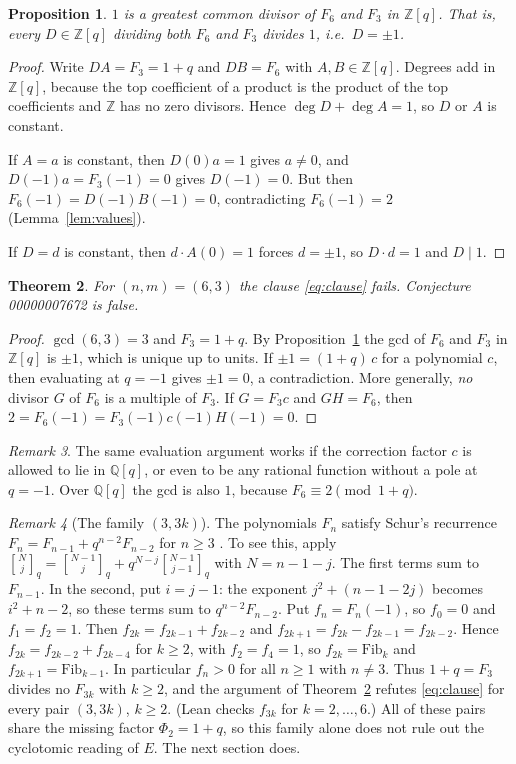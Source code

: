 \documentclass[11pt]{article}
\newtheorem{theorem}{Theorem}
\newtheorem{proposition}[theorem]{Proposition}
\theoremstyle{remark}
\newtheorem{remark}[theorem]{Remark}
\newcommand{\qbinom}[2]{\genfrac{[}{]}{0pt}{}{#1}{#2}_q}
\begin{document}
\begin{proposition}\label{prop:gcd}
$1$ is a greatest common divisor of $F_6$ and $F_3$ in $\mathbb Z[q]$. That is,
every $D\in\mathbb Z[q]$ dividing both $F_6$ and $F_3$ divides $1$, i.e.\
$D=\pm1$.
\end{proposition}
\begin{proof}
Write $DA=F_3=1+q$ and $DB=F_6$ with $A,B\in\mathbb Z[q]$. Degrees add in
$\mathbb Z[q]$, because the top coefficient of a product is the product of the
top coefficients and $\mathbb Z$ has no zero divisors. Hence
$\deg D+\deg A=1$, so $D$ or $A$ is constant.

If $A=a$ is constant, then $D(0)a=1$ gives $a\ne0$, and $D(-1)a=F_3(-1)=0$
gives $D(-1)=0$. But then $F_6(-1)=D(-1)B(-1)=0$, contradicting
$F_6(-1)=2$ (Lemma~\ref{lem:values}).

If $D=d$ is constant, then $d\cdot A(0)=1$ forces $d=\pm1$, so $D\cdot d=1$
and $D\mid 1$.
\end{proof}

\begin{theorem}\label{thm:main}
For $(n,m)=(6,3)$ the clause \eqref{eq:clause} fails. Conjecture 00000007672 is
false.
\end{theorem}
\begin{proof}
$\gcd(6,3)=3$ and $F_3=1+q$. By Proposition~\ref{prop:gcd} the gcd of $F_6$ and
$F_3$ in $\mathbb Z[q]$ is $\pm1$, which is unique up to units. If
$\pm1=(1+q)\,c$ for a polynomial $c$, then evaluating at $q=-1$ gives
$\pm1=0$, a contradiction. More generally, \emph{no} divisor $G$ of $F_6$ is a
multiple of $F_3$. If $G=F_3c$ and $GH=F_6$, then
$2=F_6(-1)=F_3(-1)c(-1)H(-1)=0$.
\end{proof}

\begin{remark}\label{rem:Q}
The same evaluation argument works if the correction factor $c$ is allowed to
lie in $\mathbb Q[q]$, or even to be any rational function without a pole at
$q=-1$. Over $\mathbb Q[q]$ the gcd is also $1$, because $F_6\equiv 2 \pmod{1+q}$.
\end{remark}

\begin{remark}[The family $(3,3k)$]
The polynomials $F_n$ satisfy Schur's recurrence
$F_n=F_{n-1}+q^{n-2}F_{n-2}$ for $n\ge3$ \cite{andrews}. To see this, apply
$\qbinom{N}{j}=\qbinom{N-1}{j}+q^{N-j}\qbinom{N-1}{j-1}$ with $N=n-1-j$. The
first terms sum to $F_{n-1}$. In the second, put $i=j-1$: the exponent
$j^2+(n-1-2j)$ becomes $i^2+n-2$, so these terms sum to $q^{n-2}F_{n-2}$.
Put $f_n=F_n(-1)$, so $f_0=0$ and $f_1=f_2=1$. Then
$f_{2k}=f_{2k-1}+f_{2k-2}$ and $f_{2k+1}=f_{2k}-f_{2k-1}=f_{2k-2}$. Hence
$f_{2k}=f_{2k-2}+f_{2k-4}$ for $k\ge2$, with $f_2=f_4=1$, so
$f_{2k}=\mathrm{Fib}_k$ and $f_{2k+1}=\mathrm{Fib}_{k-1}$. In particular
$f_n>0$ for all $n\ge1$ with $n\ne3$. Thus $1+q=F_3$ divides no $F_{3k}$ with
$k\ge2$, and the argument of Theorem~\ref{thm:main} refutes \eqref{eq:clause}
for every pair $(3,3k)$, $k\ge2$. (Lean checks $f_{3k}$ for $k=2,\dots,6$.) All
of these pairs share the missing factor $\Phi_2=1+q$, so this family alone
does not rule out the cyclotomic reading of $E$. The next section does.
\end{remark}
\end{document}
